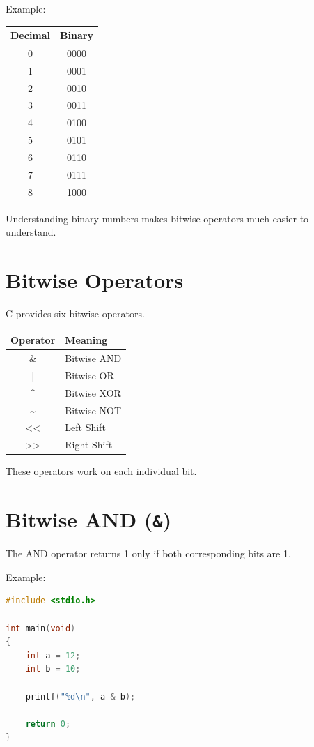 \documentclass[12pt,openany]{book}
\begin{document}
Example:

\begin{center}
\begin{tabular}{|c|c|}
\hline
Decimal & Binary \\
\hline
0 & 0000 \\
1 & 0001 \\
2 & 0010 \\
3 & 0011 \\
4 & 0100 \\
5 & 0101 \\
6 & 0110 \\
7 & 0111 \\
8 & 1000 \\
\hline
\end{tabular}
\end{center}

Understanding binary numbers makes bitwise operators much easier to understand.

\section{Bitwise Operators}

C provides six bitwise operators.

\begin{center}
\begin{tabular}{|c|l|}
\hline
Operator & Meaning \\
\hline
\& & Bitwise AND \\
| & Bitwise OR \\
\^{} & Bitwise XOR \\
\textasciitilde & Bitwise NOT \\
<< & Left Shift \\
>> & Right Shift \\
\hline
\end{tabular}
\end{center}

These operators work on each individual bit.

\section{Bitwise AND (\texttt{\&})}

The AND operator returns 1 only if both corresponding bits are 1.

Example:

\begin{lstlisting}[language=C]
#include <stdio.h>

int main(void)
{
    int a = 12;
    int b = 10;

    printf("%d\n", a & b);

    return 0;
}
\end{lstlisting}
\end{document}
